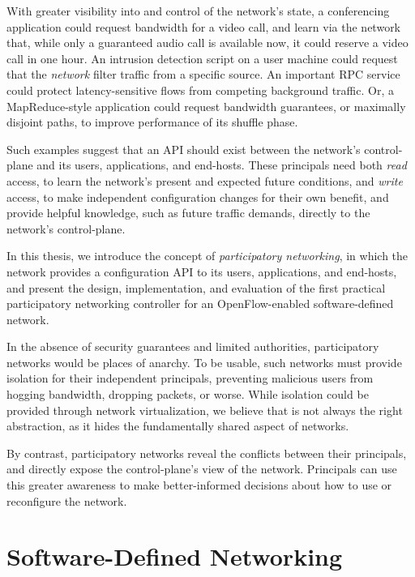 With greater visibility into and control of the network's state,
a conferencing application could request bandwidth for a video call,
and learn via the network that, while only a guaranteed audio call is available
now, it could reserve a video call in one hour.
An intrusion detection script on a user machine could request that the
\emph{network} filter traffic from a specific source.
An important RPC service could protect latency-sensitive flows from competing
background traffic.
Or, a MapReduce-style application could request
bandwidth guarantees, or maximally disjoint paths, to improve performance of its shuffle phase.

Such examples suggest that an API should exist between the network's
control-plane and its users, applications, and end-hosts. These
principals need both \emph{read} access, to learn the network's
present and expected future conditions, and \emph{write} access, to
make independent configuration changes for their own benefit, and
provide helpful knowledge, such as future traffic demands, directly
to the network's control-plane.

In this thesis, we introduce the concept of \emph{participatory
networking}, in which the network provides
a configuration API to its users, applications, and end-hosts, and
present the design, implementation, and evaluation of the first
practical participatory networking controller for an
OpenFlow-enabled software-defined network.

In the absence of security guarantees and limited authorities,
participatory networks would be places of anarchy. To be usable,
such networks must provide isolation for their independent
principals, preventing malicious users from hogging bandwidth,
dropping packets, or worse. While isolation could be provided
through network virtualization, we believe that is not always the
right abstraction, as it hides the fundamentally shared aspect of
networks.  

By contrast, participatory networks reveal the conflicts between
their principals, and directly expose the control-plane's view of
the network. Principals can use this greater awareness to make
better-informed decisions about how to use or reconfigure the
network.


\section{Software-Defined Networking}


